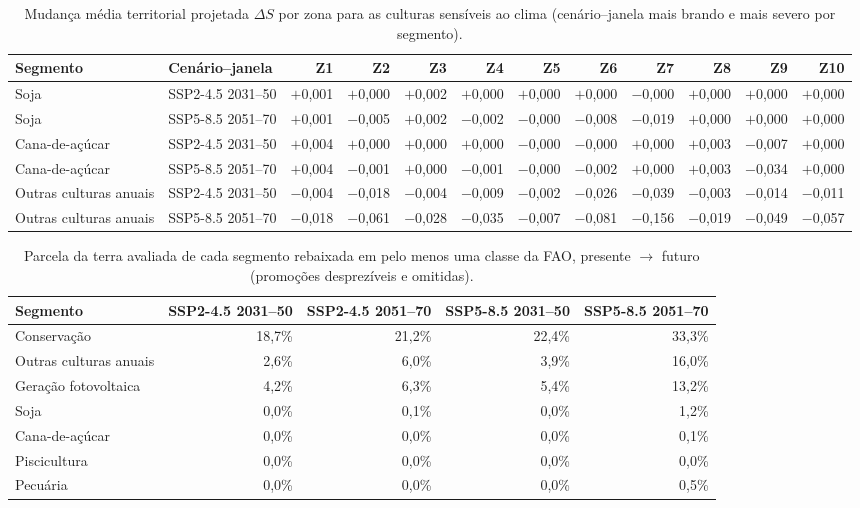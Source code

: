 \begin{table}
\centering
\caption{Mudança média territorial projetada $\Delta S$ por zona para as culturas sensíveis
ao clima (cenário--janela mais brando e mais severo por segmento).}
\label{tab:zone-shift}
\small
\begin{tabular}{@{}llrrrrrrrrrr@{}}
\toprule
Segmento & Cenário--janela & Z1 & Z2 & Z3 & Z4 & Z5 & Z6 & Z7 & Z8 & Z9 & Z10 \\
\midrule
Soja & SSP2-4.5 2031--50 & $+$0,001 & $+$0,000 & $+$0,002 & $+$0,000 & $+$0,000 & $+$0,000 & $-$0,000 & $+$0,000 & $+$0,000 & $+$0,000 \\
Soja & SSP5-8.5 2051--70 & $+$0,001 & $-$0,005 & $+$0,002 & $-$0,002 & $-$0,000 & $-$0,008 & $-$0,019 & $+$0,000 & $+$0,000 & $+$0,000 \\
Cana-de-açúcar & SSP2-4.5 2031--50 & $+$0,004 & $+$0,000 & $+$0,000 & $+$0,000 & $-$0,000 & $-$0,000 & $+$0,000 & $+$0,003 & $-$0,007 & $+$0,000 \\
Cana-de-açúcar & SSP5-8.5 2051--70 & $+$0,004 & $-$0,001 & $+$0,000 & $-$0,001 & $-$0,000 & $-$0,002 & $+$0,000 & $+$0,003 & $-$0,034 & $+$0,000 \\
Outras culturas anuais & SSP2-4.5 2031--50 & $-$0,004 & $-$0,018 & $-$0,004 & $-$0,009 & $-$0,002 & $-$0,026 & $-$0,039 & $-$0,003 & $-$0,014 & $-$0,011 \\
Outras culturas anuais & SSP5-8.5 2051--70 & $-$0,018 & $-$0,061 & $-$0,028 & $-$0,035 & $-$0,007 & $-$0,081 & $-$0,156 & $-$0,019 & $-$0,049 & $-$0,057 \\
\bottomrule
\end{tabular}
\end{table}

\begin{table}[H]
\centering
\caption{Parcela da terra avaliada de cada segmento rebaixada em pelo menos uma classe da
FAO, presente $\rightarrow$ futuro (promoções desprezíveis e omitidas).}
\label{tab:downgrade-share}
\small
\begin{tabular}{@{}lrrrr@{}}
\toprule
Segmento & SSP2-4.5 2031--50 & SSP2-4.5 2051--70 & SSP5-8.5 2031--50 & SSP5-8.5 2051--70 \\
\midrule
Conservação           & 18,7\% & 21,2\% & 22,4\% & 33,3\% \\
Outras culturas anuais & 2,6\%  & 6,0\%  & 3,9\%  & 16,0\% \\
Geração fotovoltaica   & 4,2\%  & 6,3\%  & 5,4\%  & 13,2\% \\
Soja                   & 0,0\%  & 0,1\%  & 0,0\%  & 1,2\% \\
Cana-de-açúcar         & 0,0\%  & 0,0\%  & 0,0\%  & 0,1\% \\
Piscicultura           & 0,0\%  & 0,0\%  & 0,0\%  & 0,0\% \\
Pecuária               & 0,0\%  & 0,0\%  & 0,0\%  & 0,5\% \\
\bottomrule
\end{tabular}
\end{table}

